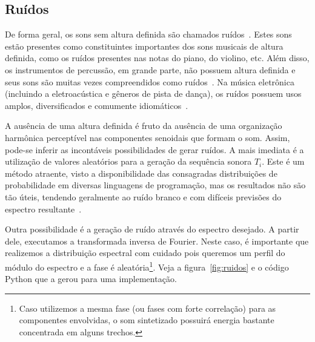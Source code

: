 \subsection{Ruídos}
De forma geral, os sons sem altura definida 
são chamados ruídos~\cite{Lacerda}.
Estes sons estão presentes como constituintes importantes dos sons musicais de altura definida,
como os ruídos presentes nas notas do piano, do violino, etc. Além disso, os instrumentos
de percussão, em grande parte, não possuem altura definida e seus sons
são muitas vezes compreendidos como ruídos~\cite{Roederer}. Na música eletrônica (incluindo
a eletroacústica e gêneros de pista de dança), os ruídos possuem usos amplos, diversificados e comumente
idiomáticos~\cite{Cook}.

A ausência de uma altura definida é fruto da ausência de uma organização harmônica perceptível nas componentes senoidais que formam o som. Assim, pode-se inferir
as incontáveis possibilidades de gerar ruídos. A mais imediata é a utilização
de valores aleatórios para a geração da sequência sonora $T_i$. Este
é um método atraente, visto a disponibilidade
das consagradas distribuições de probabilidade em diversas linguagens de programação,
mas os resultados não são tão úteis, tendendo geralmente ao ruído branco
e com difíceis previsões do espectro resultante~\cite{Cook}.

Outra possibilidade é a geração de ruído através do espectro desejado. A partir
dele, executamos a transformada inversa de Fourier. Neste caso, é importante
que realizemos a distribuição espectral com cuidado pois queremos um perfil
do módulo do espectro e a fase é aleatória\footnote{Caso utilizemos a mesma fase
(ou fases com forte correlação) para
as componentes envolvidas, o som sintetizado possuirá energia bastante concentrada
em alguns trechos.}. Veja a figura~\ref{fig:ruidos} e o código Python que a gerou para uma implementação.



